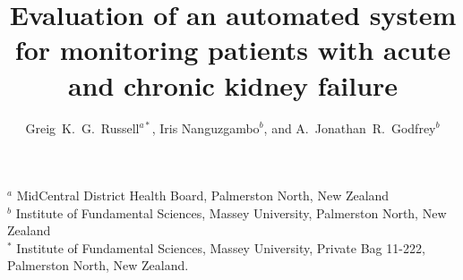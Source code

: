 \documentclass{article}
\begin{document}
\title{Evaluation of an automated system for monitoring patients with acute and chronic kidney failure}

\author{Greig~K.~G.~Russell$^{a*}$, Iris Nanguzgambo$^{b}$, and A.~Jonathan~R.~Godfrey$^{b}$}
\maketitle
\smallskip
\thispagestyle{empty}

$^a$ MidCentral District Health Board, Palmerston North, New Zealand\\

$^b$ Institute of Fundamental Sciences, Massey University, Palmerston North, New Zealand\\

$^*$ Institute of Fundamental Sciences, Massey University, Private Bag 11-222, Palmerston North, New Zealand. %










\label{LastPage}
\end{document}
